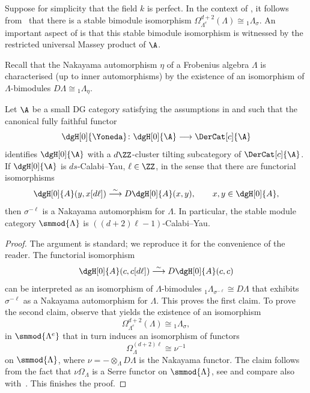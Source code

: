 \documentclass[a4paper]{amsart}
\begin{document}
\begin{remark}
  Suppose for simplicity that the field $k$ is perfect. In the context of
  , it follows from~\cite[Thm.~3.2]{Dug12} that
  there is a stable bimodule isomorphism
  $\Omega_{\Lambda^e}^{d+2}(\Lambda)\cong{}_1\Lambda_\sigma$. An important aspect of 
   is that this stable bimodule isomorphism is
  witnessed by the restricted universal Massey product of $\A$.
\end{remark}

Recall that the Nakayama automorphism $\eta$ of a Frobenius algebra $\Lambda$ is
characterised (up to inner automorphisms) by the existence of an isomorphism of
$\Lambda$-bimodules $D\Lambda\cong{}_1\Lambda_{\eta}$.

\begin{corollary}
  \label{coro:Nakayama_automorphism}
  Let $\A$ be a small DG category satisfying the assumptions in
   and such that the canonical fully faithful functor
  \[
    \dgH[0]{\Yoneda}\colon\dgH[0]{\A}\longrightarrow\DerCat[c]{\A}
  \]
  identifies $\dgH[0]{\A}$ with a $d\ZZ$-cluster tilting subcategory of
  $\DerCat[c]{\A}$. If $\dgH[0]{\A}$ is $ds$-Calabi--Yau, $\ell\in\ZZ$, in the sense that there
  are functorial isomorphisms
  \[
    \dgH[0]{A}(y,x[d\ell])\stackrel{\sim}{\longrightarrow}D\dgH[0]{A}(x,y),\qquad x,y\in\dgH[0]{A},
  \]
  then $\sigma^{-\ell}$ is a Nakayama automorphism for $\Lambda$. In particular,
  the stable module category $\smmod{\Lambda}$ is $((d+2)\ell-1)$-Calabi--Yau.
\end{corollary}
\begin{proof}
  The argument is standard; we reproduce it for the
  convenience of the reader. The functorial isomorphism
  \[
    \dgH[0]{A}(c,c[d\ell])\stackrel{\sim}{\longrightarrow}D\dgH[0]{A}(c,c)
  \]
  can be interpreted as an isomorphism of $\Lambda$-bimodules
  ${}_1\Lambda_{\sigma^{-\ell}}\cong D\Lambda$ that exhibits $\sigma^{-\ell}$ as a
  Nakayama automorphism for $\Lambda$.  This proves the first claim. To prove
  the second claim, observe that  yields the
  existence of an isomorphism
  \[
    \Omega_{\Lambda^e}^{d+2}(\Lambda)\cong{}_1\Lambda_{\sigma},
  \]
  in $\smmod{\Lambda^e}$ that in turn induces an isomorphism of functors
  \[
    \Omega_{\Lambda}^{(d+2)\ell}\cong\nu^{-1}
  \]
  on $\smmod{\Lambda}$, where $\nu=-\otimes_\Lambda D\Lambda$ is the Nakayama
  functor. The claim follows from the fact that $\nu\Omega_{\Lambda}$ is a Serre
  functor on $\smmod{\Lambda}$, see \cite[Prop.~1.2 and Cor.~1.3]{ES06} and
  compare also with~\cite[Thm.~1.8]{IV14}. This finishes the proof.
\end{proof}
\end{document}
